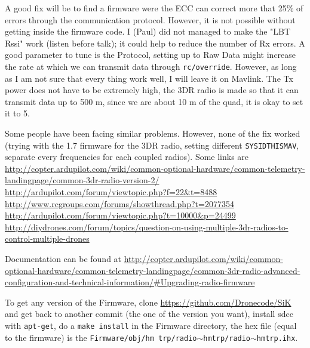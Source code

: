 \documentclass[titlepage,11pt,a4paper]{article}
\begin{document}
\begin{appendices}
A good fix will be to find a firmware were the ECC can correct more
that 25\% of errors through the communication protocol. However, it is
not possible without getting inside the firmware code. I (Paul) did
not managed to make the "LBT Rssi" work (listen before talk); it could
help to reduce the number of Rx errors. A good parameter to tune is
the Protocol, setting up to Raw Data might increase the rate at which
we can transmit data through \texttt{rc/override}. However, as long as
I am not sure that every thing work well, I will leave it on Mavlink.
The Tx power does not have to be extremely high, the 3DR radio is made
so that it can transmit data up to 500 m, since we are about 10 m of
the quad, it is okay to set it to 5.

Some people have been facing similar problems. However, none of the
fix worked (trying with the 1.7 firmware for the 3DR radio, setting
different \texttt{SYSID\textunderscore THISMAV}, separate every
frequencies for each coupled radios). Some links are
\\ \url{http://copter.ardupilot.com/wiki/common-optional-hardware/common-telemetry-landingpage/common-3dr-radio-version-2/}
\\ \url{http://ardupilot.com/forum/viewtopic.php?f=22&t=8488}
\\ \url{http://www.rcgroups.com/forums/showthread.php?t=2077354}
\\ \url{http://ardupilot.com/forum/viewtopic.php?t=10000&p=24499}
\\ \url{http://diydrones.com/forum/topics/question-on-using-multiple-3dr-radios-to-control-multiple-drones}

Documentation can be found at
\url{http://copter.ardupilot.com/wiki/common-optional-hardware/common-telemetry-landingpage/common-3dr-radio-advanced-configuration-and-technical-information/#Upgrading-radio-firmware}

To get any version of the Firmware, clone
\url{https://github.com/Dronecode/SiK} and get back to another commit
(the one of the version you want), install sdcc with \texttt{apt-get},
do a \texttt{make install} in the Firmware directory, the hex file
(equal to the firmware) is the \texttt{Firmware/obj/hm\textunderscore
  trp/radio$\sim$hm\textunderscore trp/radio$\sim$hm\textunderscore trp.ihx}.

\end{appendices}
\end{document}
